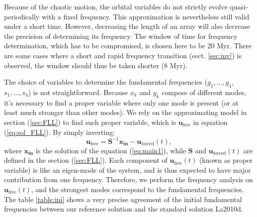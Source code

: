 \documentclass[12pt]{article}
\begin{document}
	Because of the chaotic motion, the orbital variables do not strictly evolve quasi-periodically with a fixed frequency. This approximation is nevertheless still valid under a short time. However, decreasing the length of an array will also decrease the precision of determining its frequency. The window of time for frequency determination, which has to be compromised, is chosen here to be 20 Myr. There are some cases where a short and rapid frequency transition (sect. \ref{sec:inv}) is observed, the window should thus be taken shorter (8 Myr). 

	The choice of variables to determine the fundamental frequencies ($g_1, \dots, g_4$, $s_1, \dots, s_4$) is not straightforward. Because $x_k$ and $y_k$ compose of different modes, it's necessary to find a proper variable where only one mode is present (or at least much stronger than other modes). We rely on the approximating model in section (\ref{sec:FLL}) to find such proper variable, which is $\boldsymbol{u}_{\text{free}}$ in equation (\ref{eq:sol_FLL}). By simply inverting:
	\begin{equation}
	\boldsymbol{u}_{\text{free}}   = \mathbf{S}^{-1} \boldsymbol{x_{in}} - \boldsymbol{u}_{\text{forced}} (t), \label{eq:u_free}
	\end{equation}
	where $\boldsymbol{x_{in}}$ is the solution of the equation (\ref{eq:main1}), while $\mathbf{S}$ and $\boldsymbol{u}_{\text{forced}} (t)$ are defined in the section (\ref{sec:FLL}). Each component of $\boldsymbol{u}_{\text{free}}(t)$ (known as proper variable) is like an eigen-mode of the system, and is thus expected to have major contribution from one frequency. Therefore, we perform the frequency analysis on $\boldsymbol{u}_{\text{free}}(t)$, and the strongest modes correspond to the fundamental frequencies. The table \ref{table:ini} shows a very precise agreement of the initial fundamental frequencies between our reference solution and the standard solution La2010d.
	
\end{document}
